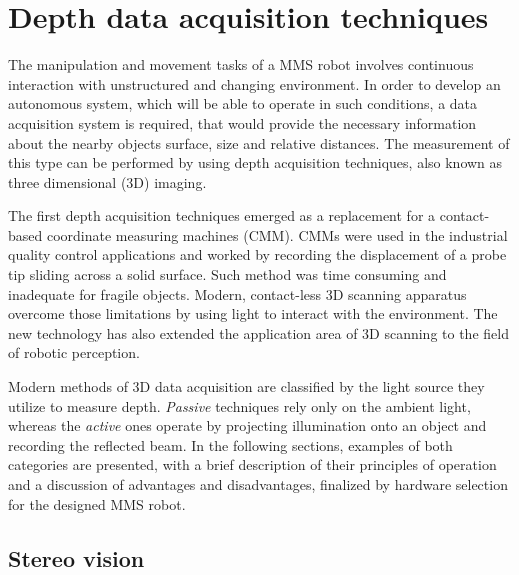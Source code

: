 \chapter{Depth data acquisition techniques}
\label{cha:acquisition}

The manipulation and movement tasks of a MMS robot involves continuous interaction with unstructured and changing environment. In order to develop an autonomous system, which will be able to operate in such conditions, a data acquisition system is required, that would provide the necessary information about the nearby objects surface, size and relative distances. The measurement of this type can be performed by using depth acquisition techniques, also known as three dimensional (3D) imaging.

The first depth acquisition techniques emerged as a replacement for a contact-based coordinate measuring machines (CMM). CMMs were used in the industrial quality control applications and worked by recording the displacement of a probe tip sliding across a solid surface. Such method was time consuming and inadequate for fragile objects. Modern, contact-less 3D scanning apparatus overcome those limitations by using light to interact with the environment. The new technology has also extended the application area of 3D scanning to the field of robotic perception.

Modern methods of 3D data acquisition are classified by the light source they utilize to measure depth. \textit{Passive} techniques rely only on the ambient light, whereas the \textit{active} ones operate by projecting illumination onto an object and recording the reflected beam. In the following sections, examples of both categories are presented, with a brief description of their principles of operation and a discussion of advantages and disadvantages, finalized by hardware selection for the designed MMS robot.


\section{Stereo vision}
\label{sec:stereo}

